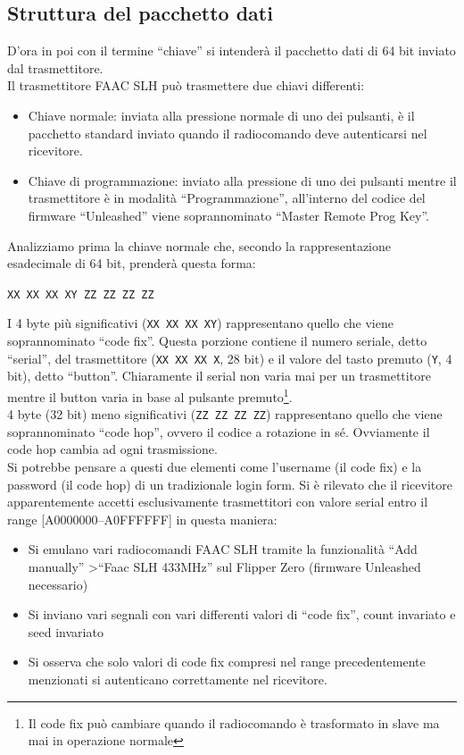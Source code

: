 \subsection{Struttura del pacchetto dati}
\label{sub:payload}
D’ora in poi con il termine “chiave” si intenderà il pacchetto dati di 64 bit inviato dal trasmettitore.\\
Il trasmettitore FAAC SLH può trasmettere due chiavi differenti:
\begin{itemize}
  \item Chiave normale: inviata alla pressione normale di uno dei pulsanti, è il pacchetto standard inviato quando il radiocomando deve autenticarsi nel ricevitore.
  \item Chiave di programmazione: inviato alla pressione di uno dei pulsanti mentre il trasmettitore è in modalità “Programmazione”, all’interno del codice del firmware “Unleashed” viene soprannominato “Master Remote Prog Key”.
\end{itemize}
Analizziamo prima la chiave normale che, secondo la rappresentazione esadecimale di 64 bit, prenderà questa forma:
\begin{center}
  \texttt{XX XX XX XY ZZ ZZ ZZ ZZ}
\end{center}
I 4 byte più significativi (\texttt{XX XX XX XY}) rappresentano quello che viene soprannominato “code fix”. Questa porzione contiene il numero seriale, detto “serial”, del trasmettitore (\texttt{XX XX XX X}, 28 bit) e il valore del tasto premuto (\texttt{Y}, 4 bit), detto “button”. Chiaramente il serial non varia mai per un trasmettitore mentre il button varia in base al pulsante premuto\footnote{Il code fix può cambiare quando il radiocomando è trasformato in slave ma mai in operazione normale}.\\
4 byte (32 bit) meno significativi (\texttt{ZZ ZZ ZZ ZZ}) rappresentano quello che viene soprannominato “code hop”, ovvero il codice a rotazione in sé. Ovviamente il code hop cambia ad ogni trasmissione.\\
Si potrebbe pensare a questi due elementi come l’username (il code fix) e la password (il code hop) di un tradizionale login form.
Si è rilevato che il ricevitore apparentemente accetti esclusivamente trasmettitori con valore serial entro il range [A0000000--A0FFFFFF] in questa maniera:\\
\begin{itemize}
  \item Si emulano vari radiocomandi FAAC SLH tramite la funzionalità “Add manually” \textgreater “Faac SLH 433MHz” sul Flipper Zero (firmware Unleashed necessario)
  \item Si inviano vari segnali con vari differenti valori di “code fix”, count invariato e seed invariato
  \item Si osserva che solo valori di code fix compresi nel range precedentemente menzionati si autenticano correttamente nel ricevitore.
\end{itemize}
